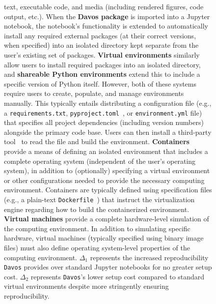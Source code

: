 \documentclass[preprint,12pt,a4paper]{elsarticle}
\begin{document}
\begin{figure}[tp]
{  text, executable code, and media (including rendered figures, code
  output, etc.). When the \textbf{Davos package} is imported
  into a Jupyter notebook, the notebook's functionality is extended to
  automatically install any required external packages (at their
  correct versions, when specified) into an isolated directory kept separate
  from the user's existing set of packages. \textbf{Virtual environments}
  similarly allow users to install required packages into an isolated
  directory, and \textbf{shareable Python environments} extend this to include
  a specific version of Python itself. However, both of these systems require
  users to create, populate, and manage environments manually. This
  typically entails distributing a configuration file (e.g., a
  \texttt{requirements.txt}, \texttt{pyproject.toml}~\cite{CannEtal16}, or
  \texttt{environment.yml} file) that specifies all project dependencies
  (including version numbers) alongside the primary code base. Users can then
  install a third-party tool~\cite[e.g.,][]{BickEtal07, Eust19, Anac12} to read
  the file and build the environment. \textbf{Containers} provide a means of
  defining an isolated environment that includes a complete operating
  system (independent of the user's operating system), in addition to
  (optionally) specifying a virtual environment or other
  configurations needed to provide the necessary computing
  environment. Containers are typically defined using
  specification files (e.g., a plain-text \texttt{Dockerfile}~\cite{Merk14}) that instruct the
  virtualization engine regarding how to build the containerized
  environment. \textbf{Virtual machines} provide a complete
  hardware-level simulation of the computing environment.  In addition
  to simulating specific hardware, virtual machines (typically
  specified using binary image files) must also define operating
  system-level properties of the computing environment.  $\Delta_1$
  represents the increased reproducibility \texttt{Davos} provides over standard
  Jupyter notebooks for no greater setup cost. $\Delta_2$ represents
  \texttt{Davos}'s lower setup cost compared to standard virtual environments
  despite more stringently ensuring reproducibility.}
\label{fig:code-sharing}
\end{figure}
\end{document}
